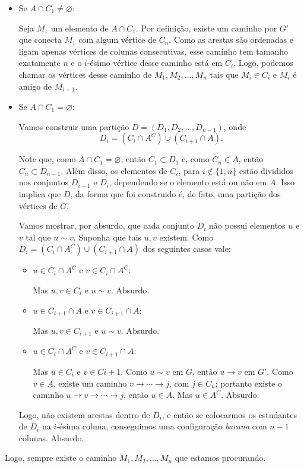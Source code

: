 \begin{itemize}
	\item Se $A \cap C_1 \neq \varnothing$:

	Seja $M_1$ um elemento de $A \cap C_1$. Por definição, existe um caminho por $G'$ que conecta $M_1$ com algum vértice de $C_n$. Como as arestas são ordenadas e ligam apenas vértices de colunas consecutivas, esse caminho tem tamanho exatamente $n$ e o $i$-ésimo vértice desse caminho está em $C_i$. Logo, podemos chamar os vértices desse caminho de $M_1, M_2, \dots, M_n$ tais que $M_i \in C_i$ e $M_i$ é amigo de $M_{i+1}$.

	\item Se $A \cap C_1 = \varnothing$:

	Vamos construir uma partição $D = (D_1, D_2, \dots, D_{n-1})$, onde
	$$D_i = (C_i \cap A^C) \cup (C_{i+1} \cap A).$$

	Note que, como $A \cap C_1 = \varnothing$, então $C_1 \subset D_1$ e, como $C_n \in A$, então $C_n \subset D_{n-1}$. Além disso, os elementos de $C_i$, para $i \not\in \{1, n\}$ estão divididos nos conjuntos $D_{i-1}$ e $D_{i}$, dependendo se o elemento está ou não em $A$. Isso implica que $D$, da forma que foi construido é, de fato, uma partição dos vértices de $G$.

	Vamos mostrar, por absurdo, que cada conjunto $D_i$ não possui elementos $u$ e $v$ tal que $u \sim v$. Suponha que tais $u, v$ existem. Como $D_i = (C_i \cap A^C) \cup (C_{i+1} \cap A)$ dos seguintes casos vale:

	\begin{itemize}
		\item $u \in C_i \cap A^C$   e $v \in C_i \cap A^C$:

			Mas $u, v \in C_i$     e $u \sim v$. Absurdo.

		\item $u \in C_{i+1} \cap A$ e $v \in C_{i+1} \cap A$:

			Mas $u, v \in C_{i+1}$ e $u \sim v$. Absurdo.

		\item $u \in C_i \cap A^C$   e $v \in C_{i+1} \cap A$:

			Mas $u \in C_i$ e $v \in C{i+1}$. Como $u \sim v$ em $G$, então $u \to v$ em $G'$. Como $v \in A$, existe um caminho $v \to \cdots \to j$, com $j \in C_n$; portanto existe o caminho $u \to v \to \cdots \to j$, então $u \in A$. Mas $u \in A^C$. Absurdo.
	\end{itemize}

	Logo, não existem arestas dentro de $D_i$, e então se colocarmos os estudantes de $D_i$ na $i$-ésima coluna, conseguimos uma configuração \textit{bacana} com $n-1$ colunas. Absurdo.
\end{itemize}

Logo, sempre existe o caminho $M_1, M_2, \dots, M_n$ que estamos procurando.